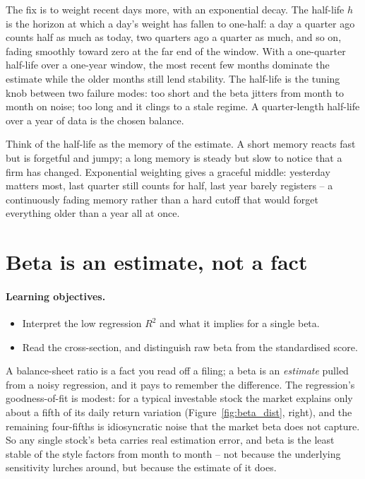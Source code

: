 \documentclass[11pt]{article}
\theoremstyle{definition}
\theoremstyle{plain}
\theoremstyle{remark}
\begin{document}
The fix is to weight recent days more, with an exponential decay. The half-life $h$ is the horizon at which a day's weight has fallen to one-half: a day a quarter ago counts half as much as today, two quarters ago a quarter as much, and so on, fading smoothly toward zero at the far end of the window. With a one-quarter half-life over a one-year window, the most recent few months dominate the estimate while the older months still lend stability. The half-life is the tuning knob between two failure modes: too short and the beta jitters from month to month on noise; too long and it clings to a stale regime. A quarter-length half-life over a year of data is the chosen balance.

\begin{intuition}
Think of the half-life as the memory of the estimate. A short memory reacts fast but is forgetful and jumpy; a long memory is steady but slow to notice that a firm has changed. Exponential weighting gives a graceful middle: yesterday matters most, last quarter still counts for half, last year barely registers -- a continuously fading memory rather than a hard cutoff that would forget everything older than a year all at once.
\end{intuition}

\section{Beta is an estimate, not a fact}\label{sec:noise}

\paragraph{Learning objectives.}
\begin{itemize}[leftmargin=1.4em,topsep=2pt]
  \item Interpret the low regression $R^2$ and what it implies for a single beta.
  \item Read the cross-section, and distinguish raw beta from the standardised score.
\end{itemize}

A balance-sheet ratio is a fact you read off a filing; a beta is an \emph{estimate} pulled from a noisy regression, and it pays to remember the difference. The regression's goodness-of-fit is modest: for a typical investable stock the market explains only about a fifth of its daily return variation (Figure~\ref{fig:beta_dist}, right), and the remaining four-fifths is idiosyncratic noise that the market beta does not capture. So any single stock's beta carries real estimation error, and beta is the least stable of the style factors from month to month -- not because the underlying sensitivity lurches around, but because the estimate of it does.
\end{document}
